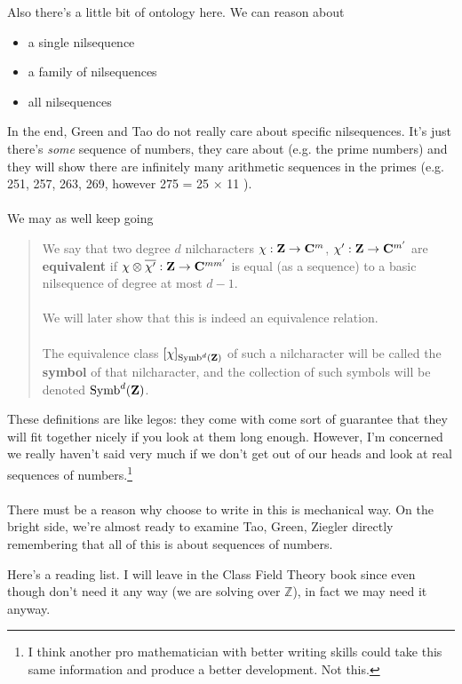 \documentclass[12pt]{article}
\begin{document}
\noindent Also there's a little bit of ontology here.  We can reason about 
\begin{itemize}
\item a single nilsequence
\item a family of nilsequences
\item all nilsequences
\end{itemize}
In the end, Green and Tao do not really care about specific nilsequences.  It's just there's \textit{some} sequence of numbers, they care about (e.g. the prime numbers) and they will show there are infinitely many arithmetic sequences in the primes (e.g. 251, 257, 263, 269, however 275 = 25 $\times$ 11 ). \\ \\
We may as well keep going 
\begin{quotation} \noindent We say that two degree ${d}$ nilcharacters ${\chi: {\bf Z} \rightarrow {\bf C}^m}$, ${\chi': {\bf Z} \rightarrow {\bf C}^{m'}}$ are \textbf{equivalent} if ${\chi \otimes \overline{\chi'}: {\bf Z} \rightarrow {\bf C}^{mm'}}$ is equal (as a sequence) to a basic nilsequence of degree at most ${d-1}$. \\ \\
We will later show that this is indeed an equivalence relation. \\ \\ The equivalence class ${[\chi]_{\mathrm{Symb}^d({\bf Z})}}$ of such a nilcharacter will be called the \textbf{symbol} of that nilcharacter, and the collection of such symbols will be denoted ${\mathrm{Symb}^d({\bf Z})}$.
\end{quotation}
These definitions are like legos: they come with come sort of guarantee that they will fit together nicely if you look at them long enough.  However, I'm concerned we really haven't said very much if we don't get out of our heads and look at real sequences of numbers.\footnote{I think another pro mathematician with better writing skills could take this same information and produce a better development.  Not this.} \\ \\
There must be a reason why choose to write in this is mechanical way.  On the bright side, we're almost ready to examine Tao, Green, Ziegler directly remembering that all of this is about sequences of numbers.

\newpage
 
\vfill


\noindent Here's a reading list. I will leave in the Class Field Theory book since even though don't need it any way (we are solving over $\mathbb{Z}$), in fact we may need it anyway.
\end{document}
